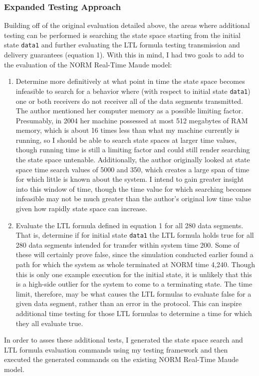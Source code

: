 \documentclass[10pt, journal]{IEEEtran}
\begin{document}
\subsubsection{Expanded Testing Approach}
Building off of the original evaluation detailed above, the areas where additional testing can be performed is searching the state space starting from the initial state \texttt{data1} and further evaluating the LTL formula testing transmission and delivery guarantees (equation 1). With this in mind, I had two goals to add to the evaluation of the NORM Real-Time Maude model:
\begin{enumerate}
	\item Determine more definitively at what point in time the state space becomes infeasible to search for a behavior where (with respect to initial state \texttt{data1}) one or both receivers do not receiver all of the data segments transmitted. The author mentioned her computer memory as a possible limiting factor. Presumably, in 2004 her machine possessed at most 512 megabytes of RAM memory, which is about 16 times less than what my machine currently is running, so I should be able to search state spaces at larger time values, though running time is still a limiting factor and could still render searching the state space untenable. Additionally, the author originally looked at state space time search values of 5000 and 350, which creates a large span of time for which little is known about the system. I intend to gain greater insight into this window of time, though the time value for which searching becomes infeasible may not be much greater than the author's original low time value given how rapidly state space can increase.
	\item Evaluate the LTL formula defined in equation 1 for all 280 data segments. That is, determine if for initial state \texttt{data1} the LTL formula holds true for all 280 data segments intended for transfer within system time 200. Some of these will certainly prove false, since the simulation conducted earlier found a path for which the system as whole terminated at NORM time 4,240. Though this is only one example execution for the initial state, it is unlikely that this is a high-side outlier for the system to come to a terminating state. The time limit, therefore, may be what causes the LTL formulas to evaluate false for a given data segment, rather than an error in the protocol. This can inspire additional time testing for those LTL formulas to determine a time for which they all evaluate true.
\end{enumerate}
In order to asses these additional tests, I generated the state space search and LTL formula evaluation commands using my testing framework and then executed the generated commands on the existing NORM Real-Time Maude model.
\end{document}
